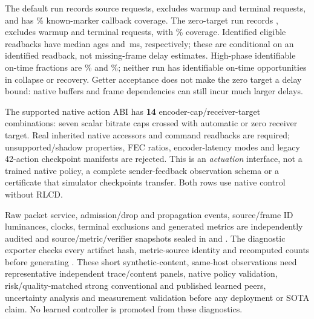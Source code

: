 \documentclass[10pt]{article}
\begin{document}
The default run records \NativeAutoSourceRequests{} source requests, excludes \NativeAutoWarmup{} warmup and \NativeAutoCensored{} terminal requests, and has \NativeAutoCoverage\% known-marker callback coverage. The zero-target run records \NativeMinJitterSourceRequests{}, excludes \NativeMinJitterWarmup{} warmup and \NativeMinJitterCensored{} terminal requests, with \NativeMinJitterCoverage\% coverage. Identified eligible readbacks have median ages \NativeAutoMedianDelay{} and \NativeMinJitterMedianDelay{}\,ms, respectively; these are conditional on an identified readback, not missing-frame delay estimates. High-phase identifiable on-time fractions are \NativeAutoHighOnPercent\% and \NativeMinJitterHighOnPercent\%; neither run has identifiable on-time opportunities in collapse or recovery. Getter acceptance does not make the zero target a delay bound: native buffers and frame dependencies can still incur much larger delays.

The supported native action ABI has \textbf{14} encoder-cap/receiver-target combinations: seven scalar bitrate caps crossed with automatic or zero receiver target. Real inherited native accessors and command readbacks are required; unsupported/shadow properties, FEC ratios, encoder-latency modes and legacy 42-action checkpoint manifests are rejected. This is an \emph{actuation} interface, not a trained native policy, a complete sender-feedback observation schema or a certificate that simulator checkpoints transfer. Both rows use native control without RLCD.

Raw packet service, admission/drop and propagation events, source/frame ID luminances, clocks, terminal exclusions and generated metrics are independently audited and source/metric/verifier snapshots sealed in  and . The diagnostic exporter  checks every artifact hash, metric-source identity and recomputed counts before generating . These short synthetic-content, same-host observations need representative independent trace/content panels, native policy validation, risk/quality-matched strong conventional and published learned peers, uncertainty analysis and measurement validation before any deployment or SOTA claim. No learned controller is promoted from these diagnostics.
\end{document}
